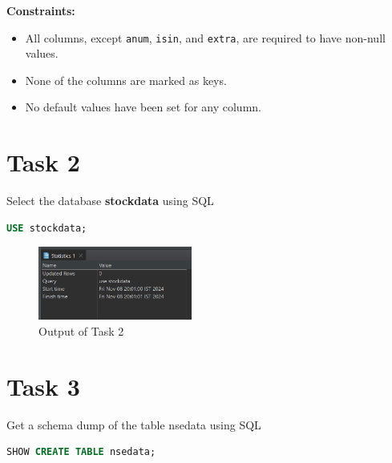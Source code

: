 \documentclass{article}
\begin{document}
\textbf{Constraints:}
\begin{itemize}
    \item All columns, except \texttt{anum}, \texttt{isin}, and \texttt{extra}, are required to have non-null values.
    \item None of the columns are marked as keys.
    \item No default values have been set for any column.
\end{itemize}

\clearpage

\section*{Task 2}

\begin{task*}[2]
Select the database \textbf{stockdata} using SQL
\end{task*}

\begin{lstlisting}[language=SQL, caption=Selecting the Database]
USE stockdata;
\end{lstlisting}

\begin{figure}[H]
	\centering
	\includegraphics[width=0.45\textwidth]{Images/Task2.png}
	\caption{Output of Task 2}
\end{figure}

\section*{Task 3}

\begin{task*}[3]
Get a schema dump of the table nsedata using SQL
\end{task*}

\begin{lstlisting}[language=SQL, caption=Schema Dump of Table nsedata]
SHOW CREATE TABLE nsedata;
\end{lstlisting}
\end{document}
